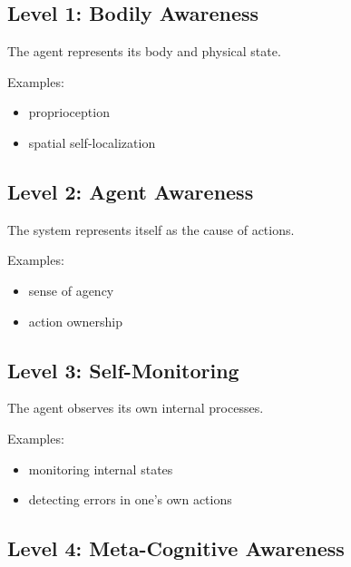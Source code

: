 \documentclass{article}
\begin{document}
        \subsection{Level 1: Bodily Awareness}
            
            The agent represents its body and physical state.
            
            Examples:
            
            \begin{itemize}
                \item proprioception
                \item spatial self-localization
            \end{itemize}
        
        \subsection{Level 2: Agent Awareness}
            
            The system represents itself as the cause of actions.
            
            Examples:
            
            \begin{itemize}
                \item sense of agency
                \item action ownership
            \end{itemize}
        
        \subsection{Level 3: Self-Monitoring}
            
            The agent observes its own internal processes.
            
            Examples:
            
            \begin{itemize}
                \item monitoring internal states
                \item detecting errors in one's own actions
            \end{itemize}
        
        \subsection{Level 4: Meta-Cognitive Awareness}
            
\end{document}
